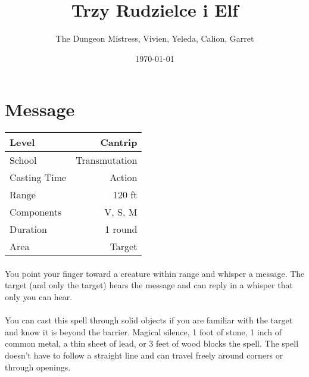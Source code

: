 \documentclass[a5paper,12pt]{article}
\title{Trzy Rudzielce i Elf}
\date{\today}
\author{The Dungeon Mistress, Vivien, Yeleda, Calion, Garret}
\begin{document}
\selectfont %



\section*{Message}

\begin{table}[h]
   \centering
   \begin{tabular}{|l|r|}
      \hline
      Level        & Cantrip \\
      \hline
      School       & Transmutation \\
      \hline
      Casting Time & Action \\
      \hline
      Range        & 120 ft \\
      \hline
      Components   & V, S, M \\
      \hline
      Duration     & 1 round\\
      \hline
      Area         & Target \\
      \hline
   \end{tabular}
\end{table}

\paragraph{}
You point your finger toward a creature within range and whisper a message. The target (and only the target) hears the message and can reply in a whisper that only you can hear.

\paragraph{}
You can cast this spell through solid objects if you are familiar with the target and know it is beyond the barrier. Magical silence, 1 foot of stone, 1 inch of common metal, a thin sheet of lead, or 3 feet of wood blocks the spell. The spell doesn't have to follow a straight line and can travel freely around corners or through openings.

\newpage
\end{document}
